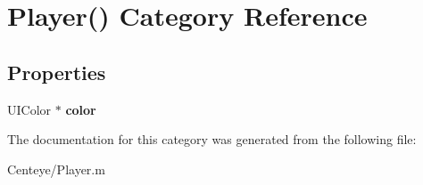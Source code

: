 \hypertarget{category_player_07_08}{\section{Player() Category Reference}
\label{category_player_07_08}
}
\subsection*{Properties}
\begin{DoxyCompactItemize}
\item 
\hypertarget{category_player_07_08_a9b4c91ac2293ba9395a928ffe716bf93}{U\+I\+Color $\ast$ {\bfseries color}}\label{category_player_07_08_a9b4c91ac2293ba9395a928ffe716bf93}

\end{DoxyCompactItemize}


The documentation for this category was generated from the following file\+:\begin{DoxyCompactItemize}
\item 
Centeye/Player.\+m\end{DoxyCompactItemize}
